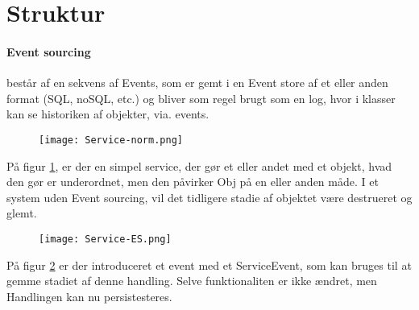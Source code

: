 \section{Struktur}

\paragraph{Event sourcing} består af en sekvens af Events, som er gemt i en Event store af et eller anden format (SQL, noSQL, etc.) og bliver som regel brugt som en log, hvor i klasser kan se historiken af objekter, via. events. 

\begin{figure}[H]
    \centering
    \texttt{[image: Service-norm.png]}
    \label{fig:service-model}
\end{figure}

På figur \ref{fig:service-model}, er der en simpel service, der gør et eller andet med et objekt, hvad den gør er underordnet, men den påvirker Obj på en eller anden måde. I et system uden Event sourcing, vil det tidligere stadie af objektet være destrueret og glemt.

\begin{figure}[H]
    \centering
    \texttt{[image: Service-ES.png]}
    \label{fig:service-ES-model}
\end{figure}

På figur \ref{fig:service-ES-model} er der introduceret et event med et ServiceEvent, som kan bruges til at gemme stadiet af denne handling. Selve funktionaliten er ikke ændret, men Handlingen kan nu persistesteres. 